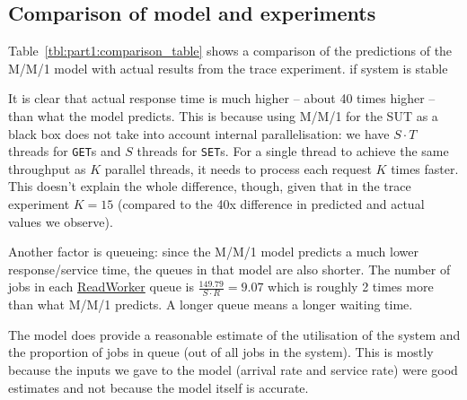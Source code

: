 \documentclass[11pt]{article}
\newcommand{\get}[0]{\texttt{GET}}
\newcommand{\set}[0]{\texttt{SET}}
\newcommand{\todo}[1]{\fcolorbox{black}{Apricot}{TODO: #1}}
\newcommand{\linkmain}[1]{\href{https://gitlab.inf.ethz.ch/pungast/asl-fall16-project/blob/master/src/main/java/asl/#1.java}{#1}}
\begin{document}


\subsection{Comparison of model and experiments}




Table~\ref{tbl:part1:comparison_table} shows a comparison of the predictions of the M/M/1 model with actual results from the trace experiment. \todo{mention} if system is stable

It is clear that actual response time is much higher -- about 40 times higher -- than what the model predicts. This is because using M/M/1 for the SUT as a black box does not take into account internal parallelisation: we have $S \cdot T$ threads for \get{}s and $S$ threads for \set{}s. For a single thread to achieve the same throughput as $K$ parallel threads, it needs to process each request $K$ times faster. This doesn't explain the whole difference, though, given that in the trace experiment $K=15$ (compared to the 40x difference in predicted and actual values we observe).

Another factor is queueing: since the M/M/1 model predicts a much lower response/service time, the queues in that model are also shorter. The number of jobs in each \linkmain{ReadWorker} queue is $\frac{149.79}{S \cdot R} = 9.07$ which is roughly 2 times more than what M/M/1 predicts. A longer queue means a longer waiting time.

The model does provide a reasonable estimate of the utilisation of the system and the proportion of jobs in queue (out of all jobs in the system). This is mostly because the inputs we gave to the model (arrival rate and service rate) were good estimates and not because the model itself is accurate.
\end{document}
